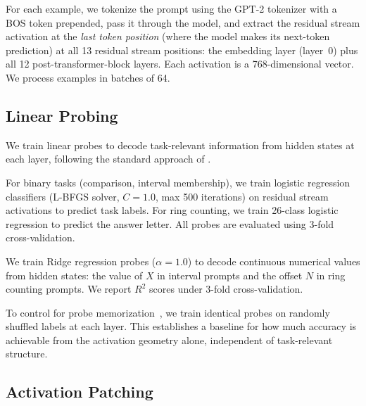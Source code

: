 For each example, we tokenize the prompt using the GPT-2 tokenizer with a BOS token prepended, pass it through the model, and extract the residual stream activation at the \emph{last token position} (where the model makes its next-token prediction) at all 13 residual stream positions: the embedding layer (layer~0) plus all 12 post-transformer-block layers. Each activation is a 768-dimensional vector. We process examples in batches of 64.

\subsection{Linear Probing}
\label{sec:probing}

We train linear probes to decode task-relevant information from hidden states at each layer, following the standard approach of \citet{alain2017understanding}.

 For binary tasks (comparison, interval membership), we train logistic regression classifiers (L-BFGS solver, $C = 1.0$, max 500 iterations) on residual stream activations to predict task labels. For ring counting, we train 26-class logistic regression to predict the answer letter. All probes are evaluated using 3-fold cross-validation.

 We train Ridge regression probes ($\alpha = 1.0$) to decode continuous numerical values from hidden states: the value of $X$ in interval prompts and the offset $N$ in ring counting prompts. We report $R^2$ scores under 3-fold cross-validation.

 To control for probe memorization~\citep{hewitt2019designing}, we train identical probes on randomly shuffled labels at each layer. This establishes a baseline for how much accuracy is achievable from the activation geometry alone, independent of task-relevant structure.

\subsection{Activation Patching}
\label{sec:patching}


